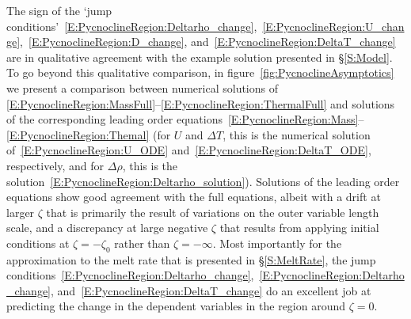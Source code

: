 \documentclass[openacc]{rsproca_new}%
\begin{document}
The sign of the `jump conditions'~\eqref{E:PycnoclineRegion:Deltarho_change},~\eqref{E:PycnoclineRegion:U_change},~\eqref{E:PycnoclineRegion:D_change}, and~\eqref{E:PycnoclineRegion:DeltaT_change} are in qualitative agreement with the example solution presented in \S\ref{S:Model}. To go beyond this qualitative comparison, in figure~\ref{fig:PycnoclineAsymptotics} we present a comparison between numerical solutions of \eqref{E:PycnoclineRegion:MassFull}--\eqref{E:PycnoclineRegion:ThermalFull} and solutions of the corresponding leading order equations~\eqref{E:PycnoclineRegion:Mass}--\eqref{E:PycnoclineRegion:Themal}  (for $U$ and $\Delta T$, this is the numerical solution of~\eqref{E:PycnoclineRegion:U_ODE} and~\eqref{E:PycnoclineRegion:DeltaT_ODE}, respectively, and for $\Delta \rho$, this is the solution~\eqref{E:PycnoclineRegion:Deltarho_solution}). Solutions of the leading order equations show good agreement with the full equations, albeit with a drift at larger $\zeta$ that is primarily the result of variations on the outer variable length scale, and a discrepancy at large negative $\zeta$ that results from applying  initial conditions at $\zeta = -\zeta_0$ rather than $\zeta = -\infty$. Most importantly for the approximation to the melt rate that is presented in \S\ref{S:MeltRate}, the jump conditions~\eqref{E:PycnoclineRegion:Deltarho_change},~\eqref{E:PycnoclineRegion:Deltarho_change}, and~\eqref{E:PycnoclineRegion:DeltaT_change} do an excellent job at predicting the change in the dependent variables in the region around $\zeta = 0$.

\end{document}
